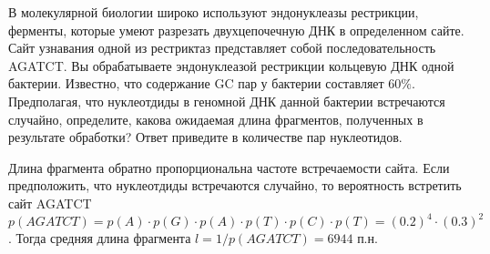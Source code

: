 
В молекулярной биологии
широко используют эндонуклеазы рестрикции, ферменты, которые умеют разрезать
двухцепочечную ДНК в определенном сайте. Сайт узнавания одной из рестриктаз
представляет собой последовательность AGATCT. Вы обрабатываете эндонуклеазой
рестрикции кольцевую ДНК одной бактерии. Известно, что содержание GC пар у
бактерии составляет $60\%$. 
Предполагая, что нуклеотдиды в геномной ДНК данной бактерии встречаются случайно, определите, какова ожидаемая длина фрагментов, полученных в
результате обработки? Ответ приведите в количестве пар нуклеотидов.

\solutionSection

Длина фрагмента обратно пропорциональна частоте встречаемости сайта. 
Если предположить, что нуклеотдиды встречаются случайно, то вероятность встретить 
сайт AGATCT $p(AGATCT)=p(A) \cdot p(G) \cdot p(A) \cdot p(T) \cdot p(C) \cdot p(T)= (0.2)^4 \cdot (0.3)^2$. 
Тогда средняя длина фрагмента $l=1/p(AGATCT) =  6944$ п.н.

